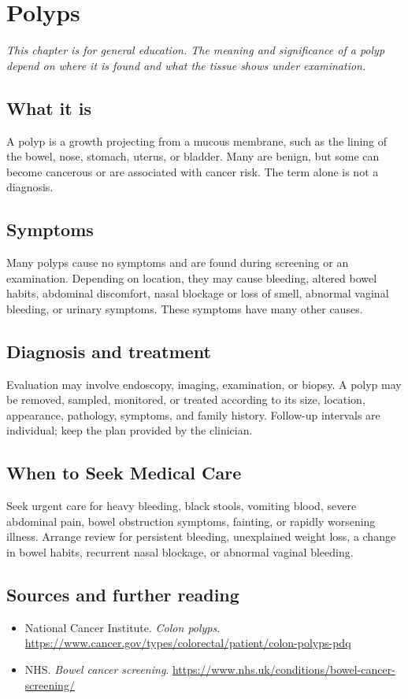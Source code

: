 \chapter{Polyps}

\medskip
\noindent\textit{This chapter is for general education. The meaning and significance of a polyp depend on where it is found and what the tissue shows under examination.}

\section*{What it is}
A polyp is a growth projecting from a mucous membrane, such as the lining of the bowel, nose, stomach, uterus, or bladder. Many are benign, but some can become cancerous or are associated with cancer risk. The term alone is not a diagnosis.

\section*{Symptoms}
Many polyps cause no symptoms and are found during screening or an examination. Depending on location, they may cause bleeding, altered bowel habits, abdominal discomfort, nasal blockage or loss of smell, abnormal vaginal bleeding, or urinary symptoms. These symptoms have many other causes.

\section*{Diagnosis and treatment}
Evaluation may involve endoscopy, imaging, examination, or biopsy. A polyp may be removed, sampled, monitored, or treated according to its size, location, appearance, pathology, symptoms, and family history. Follow-up intervals are individual; keep the plan provided by the clinician.

\section*{When to Seek Medical Care}
Seek urgent care for heavy bleeding, black stools, vomiting blood, severe abdominal pain, bowel obstruction symptoms, fainting, or rapidly worsening illness. Arrange review for persistent bleeding, unexplained weight loss, a change in bowel habits, recurrent nasal blockage, or abnormal vaginal bleeding.

\section*{Sources and further reading}
\begin{itemize}
\item National Cancer Institute. \textit{Colon polyps}. \url{https://www.cancer.gov/types/colorectal/patient/colon-polyps-pdq}
\item NHS. \textit{Bowel cancer screening}. \url{https://www.nhs.uk/conditions/bowel-cancer-screening/}
\end{itemize}
